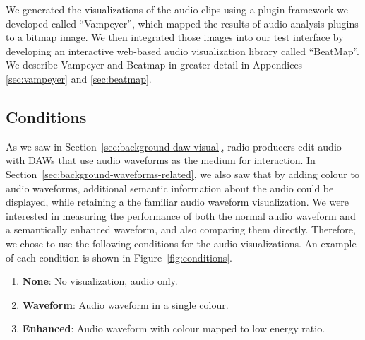 We generated the visualizations of the audio clips using a plugin framework we developed called ``Vampeyer'', which
mapped the results of audio analysis plugins to a bitmap image. We then integrated those images into our test interface
by developing an interactive web-based audio visualization library called ``BeatMap''.  We describe Vampeyer and
Beatmap in greater detail in Appendices \ref{sec:vampeyer} and \ref{sec:beatmap}.

\subsection{Conditions}
As we saw in Section~\ref{sec:background-daw-visual}, radio producers edit audio with DAWs that use audio waveforms as
the medium for interaction. In Section~\ref{sec:background-waveforms-related}, we also saw that by adding colour to
audio waveforms, additional semantic information about the audio could be displayed, while retaining a the familiar
audio waveform visualization.  We were interested in measuring the performance of both the normal audio waveform and a
semantically enhanced waveform, and also comparing them directly.  Therefore, we chose to use the following conditions
for the audio visualizations. An example of each condition is shown in Figure~\ref{fig:conditions}.

\begin{enumerate}[label=C\arabic*.]
  \item \textbf{None}: No visualization, audio only.
  \item \textbf{Waveform}: Audio waveform in a single colour.
  \item \textbf{Enhanced}: Audio waveform with colour mapped to low energy ratio.
\end{enumerate}

